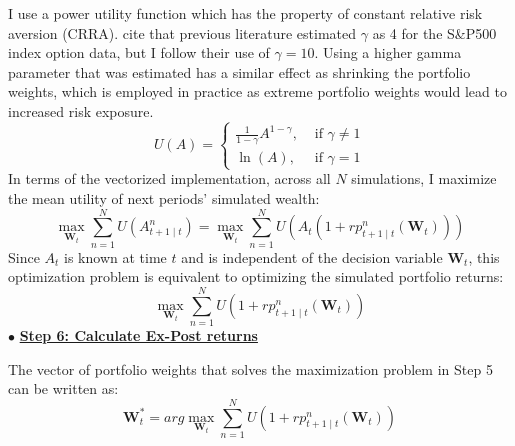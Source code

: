 I use a power utility function which has the property of constant relative risk aversion (CRRA). \cite{faias2017optimal} cite that previous literature estimated $\gamma$ as 4 for the S\&P500 index option data, but I follow their use of $\gamma = 10$. Using a higher gamma parameter that was estimated has a similar effect as shrinking the portfolio weights, which is employed in practice as extreme portfolio weights would lead to increased risk exposure.
\noindent
\[U(A)=\left\{\begin{array}{ll}\frac{1}{1-\gamma} A^{1-\gamma}, & \text { if } \gamma \neq 1 \\ \ln (A), & \text { if } \gamma=1\end{array}\right.\]
\noindent
In terms of the vectorized implementation, across all $N$ simulations, I maximize the mean utility of next periods' simulated wealth:
\noindent
\[\max_{\mathbf{W}_{t}} \sum_{n = 1}^{N} U(A_{t+1 \mid t}^{n}) = \max_{\mathbf{W}_{t}} \sum_{n = 1}^{N} U(A_{t}(1 + rp_{t + 1 \mid t}^{n}(\mathbf{W}_{t})))\]
\noindent
Since $A_{t}$ is known at time $t$ and is independent of the decision variable $\mathbf{W}_{t}$, this optimization problem is equivalent to optimizing the simulated portfolio returns:
\noindent
\[\max_{\mathbf{W}_{t}} \sum_{n = 1}^{N} U(1 + rp_{t+1 \mid t}^{n}(\mathbf{W}_{t}))\]
\noindent
$\bullet$ \underline{\textbf{Step 6: Calculate Ex-Post returns}}

The vector of portfolio weights that solves the maximization problem in Step 5 can be written as:
\noindent
\[\mathbf{W}_{t}^{*} = arg \max_{\mathbf{W}_{t}} \sum_{n = 1}^{N} U(1 + rp_{t+1 \mid t}^{n}(\mathbf{W}_{t}))\]

